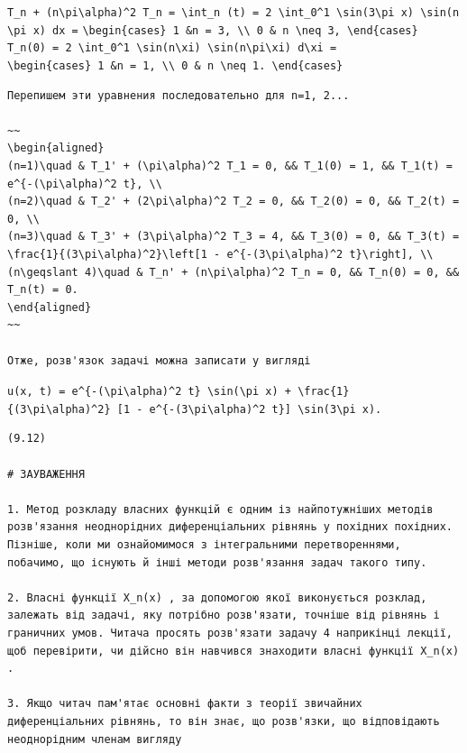\documentclass[
  ukrainian,
]{article}
\begin{document}
\texttt{T\_n\ +\ (n\textbackslash{}pi\textbackslash{}alpha)\^{}2\ T\_n\ =\ \textbackslash{}int\_n\ (t)\ =\ 2\ \textbackslash{}int\_0\^{}1\ \textbackslash{}sin(3\textbackslash{}pi\ x)\ \textbackslash{}sin(n\textbackslash{}pi\ x)\ dx\ =}
\texttt{\textbackslash{}begin\{cases\}\ 1\ \&n\ =\ 3,\ \textbackslash{}\textbackslash{}\ 0\ \&\ n\ \textbackslash{}neq\ 3,\ \textbackslash{}end\{cases\}}
\texttt{T\_n(0)\ =\ 2\ \textbackslash{}int\_0\^{}1\ \textbackslash{}sin(n\textbackslash{}xi)\ \textbackslash{}sin(n\textbackslash{}pi\textbackslash{}xi)\ d\textbackslash{}xi\ =}
\texttt{\textbackslash{}begin\{cases\}\ 1\ \&n\ =\ 1,\ \textbackslash{}\textbackslash{}\ 0\ \&\ n\ \textbackslash{}neq\ 1.\ \textbackslash{}end\{cases\}}

\begin{verbatim}
Перепишем эти уравнения последовательно для n=1, 2...

~~
\begin{aligned}
(n=1)\quad & T_1' + (\pi\alpha)^2 T_1 = 0, && T_1(0) = 1, && T_1(t) = e^{-(\pi\alpha)^2 t}, \\
(n=2)\quad & T_2' + (2\pi\alpha)^2 T_2 = 0, && T_2(0) = 0, && T_2(t) = 0, \\
(n=3)\quad & T_3' + (3\pi\alpha)^2 T_3 = 4, && T_3(0) = 0, && T_3(t) = \frac{1}{(3\pi\alpha)^2}\left[1 - e^{-(3\pi\alpha)^2 t}\right], \\
(n\geqslant 4)\quad & T_n' + (n\pi\alpha)^2 T_n = 0, && T_n(0) = 0, && T_n(t) = 0.
\end{aligned}
~~

Отже, розв'язок задачі можна записати у вигляді
\end{verbatim}

\texttt{u(x,\ t)\ =\ e\^{}\{-(\textbackslash{}pi\textbackslash{}alpha)\^{}2\ t\}\ \textbackslash{}sin(\textbackslash{}pi\ x)\ +\ \textbackslash{}frac\{1\}\{(3\textbackslash{}pi\textbackslash{}alpha)\^{}2\}\ {[}1\ -\ e\^{}\{-(3\textbackslash{}pi\textbackslash{}alpha)\^{}2\ t\}{]}\ \textbackslash{}sin(3\textbackslash{}pi\ x).}

\begin{verbatim}
(9.12)

# ЗАУВАЖЕННЯ

1. Метод розкладу власних функцій є одним із найпотужніших методів розв'язання неоднорідних диференціальних рівнянь у похідних похідних. Пізніше, коли ми ознайомимося з інтегральними перетвореннями, побачимо, що існують й інші методи розв'язання задач такого типу.

2. Власні функції X_n(x) , за допомогою якої виконується розклад, залежать від задачі, яку потрібно розв'язати, точніше від рівнянь і граничних умов. Читача просять розв'язати задачу 4 наприкінці лекції, щоб перевірити, чи дійсно він навчився знаходити власні функції X_n(x) .

3. Якщо читач пам'ятає основні факти з теорії звичайних диференціальних рівнянь, то він знає, що розв'язки, що відповідають неоднорідним членам вигляду
\end{verbatim}
\end{document}
